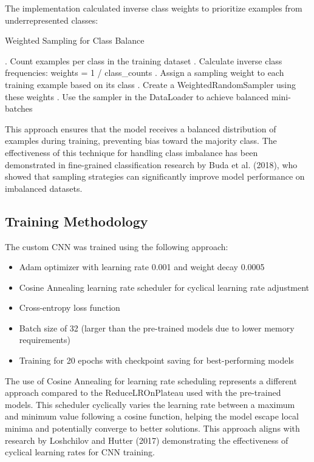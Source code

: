 The implementation calculated inverse class weights to prioritize examples from underrepresented classes:

\begin{algorithm}
\caption{Weighted Sampling for Class Balance}
\begin{algorithmic}
. Count examples per class in the training dataset
. Calculate inverse class frequencies: weights = 1 / class\_counts
. Assign a sampling weight to each training example based on its class
. Create a WeightedRandomSampler using these weights
. Use the sampler in the DataLoader to achieve balanced mini-batches
\end{algorithmic}
\end{algorithm}

This approach ensures that the model receives a balanced distribution of examples during training, preventing bias toward the majority class. The effectiveness of this technique for handling class imbalance has been demonstrated in fine-grained classification research by Buda et al. (2018), who showed that sampling strategies can significantly improve model performance on imbalanced datasets.

\subsection{Training Methodology}

The custom CNN was trained using the following approach:

\begin{itemize}
    \item Adam optimizer with learning rate 0.001 and weight decay 0.0005
    \item Cosine Annealing learning rate scheduler for cyclical learning rate adjustment
    \item Cross-entropy loss function
    \item Batch size of 32 (larger than the pre-trained models due to lower memory requirements)
    \item Training for 20 epochs with checkpoint saving for best-performing models
\end{itemize}

The use of Cosine Annealing for learning rate scheduling represents a different approach compared to the ReduceLROnPlateau used with the pre-trained models. This scheduler cyclically varies the learning rate between a maximum and minimum value following a cosine function, helping the model escape local minima and potentially converge to better solutions. This approach aligns with research by Loshchilov and Hutter (2017) demonstrating the effectiveness of cyclical learning rates for CNN training.

